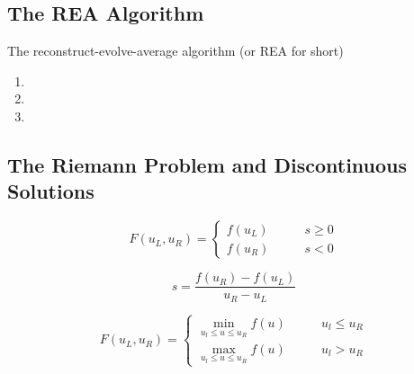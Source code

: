 \documentclass{myproject}
\begin{document}
\subsection{The REA Algorithm}

The reconstruct-evolve-average algorithm (or REA for short)
\begin{enumerate}
    \item
    

    \item


    \item


\end{enumerate}

\subsection{The Riemann Problem and Discontinuous Solutions}

\begin{equation}
    F(u_L, u_R) = \begin{cases}
        f(u_L) \qquad &s \geq 0 \\
        f(u_R) \qquad &s < 0
    \end{cases}
\end{equation}

\begin{equation}
    s = \frac{f(u_R) - f(u_L)}{u_R - u_L}
\end{equation}

\begin{equation}
    F(u_L, u_R) = \begin{cases}
        \min_{u_l \leq u \leq u_R} f(u) \qquad & u_l \leq u_R \\
        \max_{u_l \leq u \leq u_R} f(u) \qquad & u_l > u_R 
    \end{cases}
\end{equation}
\end{document}
